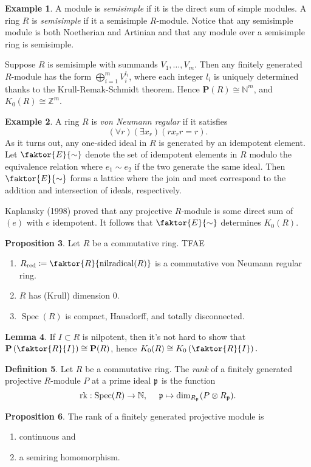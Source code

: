 \documentclass[10pt,letterpaper,cm]{nupset}
\theoremstyle{definition}
\newtheorem{definition}{Definition}[section]
\newtheorem{exmp}[definition]{Example}
\theoremstyle{theorem}
\newtheorem{lemma}[definition]{Lemma}
\newtheorem{prop}[definition]{Proposition}
\theoremstyle{remark}
\newcommand{\N}{\mathbb N}
\renewcommand{\P}{\mathbf P}
\newcommand{\Z}{\mathbb Z}
\newcommand{\1}{\mathbf{1}}
\newcommand{\0}{\vec 0}
\DeclareMathOperator{\nilrad}{nilradical}
\DeclareMathOperator{\red}{red}
\DeclareMathOperator{\spec}{Spec}
\DeclareMathOperator{\rk}{rk}
\begin{document}
\begin{exmp}
A module is \textit{semisimple} if it is the direct sum of simple modules. A ring $R$ is  \textit{semisimple} if it a semisimple $R$-module. Notice that any semisimple module is both Noetherian and Artinian and that any module over a semisimple ring is semisimple. 

 Suppose $R$ is semisimple with summands $V_1, \ldots, V_m$. Then any finitely generated $R$-module has the form $\bigoplus_{i=1}^m V_i^{l_i}$, where each integer $l_i$ is uniquely determined thanks to the Krull-Remak-Schmidt theorem. Hence $\P(R) \cong \N^m$, and $K_0(R) \cong \Z^m$.
\end{exmp}

\begin{exmp}
A ring $R$ is \textit{von Neumann regular} if it satisfies $$\left(\forall{r} \right)\left(\exists{x_r}\right)\left(rx_rr=r\right).$$ As it turns out, any one-sided ideal in $R$ is generated by an idempotent element. Let $\faktor{E}{\sim}$ denote the set of idempotent elements in $R$ modulo the equivalence relation where $e_1 \sim e_2$ if the two generate the same ideal. Then  $\faktor{E}{\sim}$  forms a lattice where the join and meet correspond to the addition and intersection of ideals, respectively.

\smallskip

 Kaplansky (1998) proved that any projective $R$-module is some direct sum of $\left(e\right)$ with $e$ idempotent. It follows that $\faktor{E}{\sim}$ determines $K_0(R)$.
\end{exmp}

\begin{prop}\label{Krull}
Let $R$ be a commutative ring. TFAE
\begin{enumerate}
\item $R_{\red}\coloneqq \faktor{R}{\nilrad(R)}$ is a commutative von Neumann regular ring.
\item $R$ has (Krull) dimension $0$.
\item $\spec(R)$ is compact, Hausdorff, and totally disconnected.
\end{enumerate}
\end{prop}

\begin{lemma}\label{L5}
If $I\subset R$ is nilpotent, then it's not hard to show that $\P\left(\faktor{R}{I}\right) \cong \P(R)$, hence $K_0(R) \cong K_0\left(\faktor{R}{I}\right).$
\end{lemma}

\begin{definition}
Let $R$ be a commutative ring. The \textit{rank} of a finitely generated projective $R$-module $P$ at a prime ideal $\frak{p}$ is the function $$\rk: \spec(R) \to \N,\  \quad \frak{p} \mapsto \dim_{R_{\frak{p}}} (P \otimes R_{\frak{p}}).$$
\end{definition}
\begin{prop} The rank of a finitely generated projective module is
\begin{enumerate}
\item continuous and
\item a semiring homomorphism.
\end{enumerate}
\end{prop}
\end{document}
